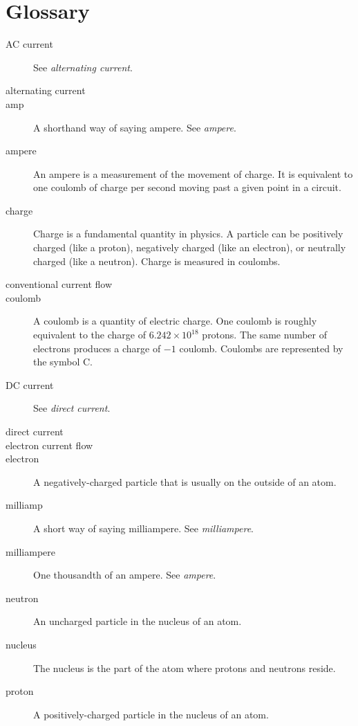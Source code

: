 \chapter{Glossary}
\label{chapGlossary}

\begin{description}
\item[AC current] See \emph{alternating current}.
\item[alternating current]
\item[amp] A shorthand way of saying ampere.  See \emph{ampere}.
\item[ampere] An ampere is a measurement of the movement of charge.  It is equivalent to one coulomb of charge per second moving past a given point in a circuit.
\item[charge] Charge is a fundamental quantity in physics.  A particle can be positively charged (like a proton), negatively charged (like an electron), or neutrally charged (like a neutron).  Charge is measured in coulombs.
\item[conventional current flow]
\item[coulomb] A coulomb is a quantity of electric charge.  One coulomb is roughly equivalent to the charge of $6.242×10^18$ protons.  The same number of electrons produces a charge of $-1$ coulomb.  Coulombs are represented by the symbol C.
\item[DC current] See \emph{direct current}.
\item[direct current]
\item[electron current flow]
\item[electron] A negatively-charged particle that is usually on the outside of an atom.
\item[milliamp] A short way of saying milliampere.  See \emph{milliampere}.
\item[milliampere] One thousandth of an ampere.  See \emph{ampere}.
\item[neutron] An uncharged particle in the nucleus of an atom.
\item[nucleus] The nucleus is the part of the atom where protons and neutrons reside. 
\item[proton] A positively-charged particle in the nucleus of an atom.

\end{description}

